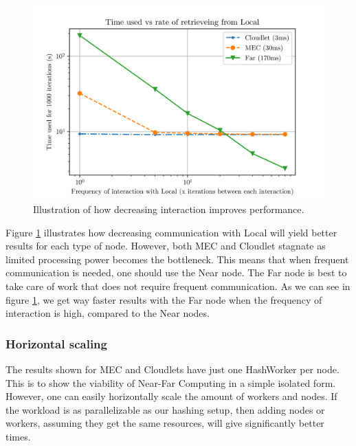 \begin{figure}
    \centering
    \includegraphics{chapters/6_evaluation/figures/All_latency.png}
    \caption{Illustration of how decreasing interaction improves performance.}
    \label{fig:all_graph_decrease}
\end{figure}

Figure \ref{fig:all_graph_decrease} illustrates how decreasing communication with Local will yield better results for each type of node. However, both MEC and Cloudlet stagnate as limited processing power becomes the bottleneck. This means that when frequent communication is needed, one should use the Near node. The Far node is best to take care of work that does not require frequent communication. As we can see in figure \ref{fig:all_graph_decrease}, we get way faster results with the Far node when the frequency of interaction is high, compared to the Near nodes.





\subsubsection{Horizontal scaling}
The results shown for MEC and Cloudlets have just one HashWorker per node. This is to show the viability of Near-Far Computing in a simple isolated form. However, one can easily horizontally scale the amount of workers and nodes. If the workload is as parallelizable as our hashing setup, then adding nodes or workers, assuming they get the same resources, will give significantly better times.


